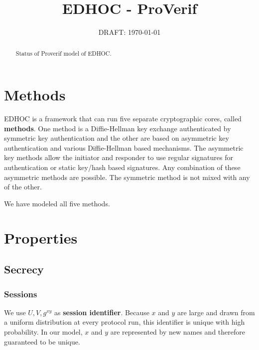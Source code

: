 \documentclass[a4paper,11pt]{article}
\theoremstyle{plain}
\theoremstyle{plain}
\begin{document}
\title{EDHOC - ProVerif}
\author{{\color{red} DRAFT: \today}}
%
\maketitle
%

\begin{abstract}
Status of Proverif model of EDHOC.
\end{abstract}
%

\section{Methods}
EDHOC is a framework that can run five separate cryptographic cores, called
\textbf{methods}.
%
One method is a Diffie-Hellman key exchange authenticated by symmetric key
authentication and the other are based on asymmetric key authentication and
various Diffie-Hellman based mechanisms.
%
The asymmetric key methods allow the initiator and responder to use
regular signatures for authentication or static key/hash based signatures.
%
Any combination of these asymmetric methods are possible.
%
The symmetric method is not mixed with any of the other.
%

We have modeled all five methods.
%

\section{Properties}
\subsection{Secrecy}
\subsubsection{Sessions}
%
We use $U, V, g^{xy}$ as \textbf{session identifier}.
%
Because $x$ and $y$ are large and drawn from a uniform distribution at every
protocol run, this identifier is unique with high probability.
%
In our model, $x$ and $y$ are represented by new names and therefore guaranteed
to be unique.
%
%
\end{document}
